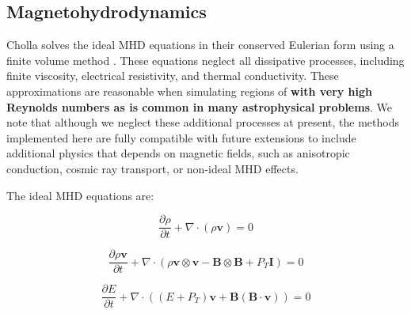 \documentclass[modern, linenumbers]{aastex631}
\begin{document}

\subsection{Magnetohydrodynamics}
\label{sec:methods-mhd}

Cholla solves the ideal MHD equations in their conserved Eulerian form using a finite volume method \citep{Godunov}. These equations neglect all dissipative processes, including finite viscosity, electrical resistivity, and thermal conductivity. These approximations are reasonable when simulating regions of \textbf{with very high Reynolds numbers as is common in many astrophysical problems}. We note that although we neglect these additional processes at present, the methods implemented here are fully compatible with future extensions to include additional physics that depends on magnetic fields, such as anisotropic conduction, cosmic ray transport, or non-ideal MHD effects.

The ideal MHD equations are:

\begin{equation}
    \label{eqn:mass-conservation}
    \frac{\partial \rho}{\partial t} + \nabla \cdot (\rho \boldsymbol{v}) = 0
\end{equation}

\begin{equation}
    \label{eqn:momentum-conservation}
    \frac{\partial \rho\boldsymbol{v}}{\partial t} + \nabla \cdot (\rho \boldsymbol{v}\otimes\boldsymbol{v} - \boldsymbol{B}\otimes\boldsymbol{B} + P_T\boldsymbol{I}) = 0
\end{equation}

\begin{equation}
    \label{eqn:energy-conservation}
    \frac{\partial E}{\partial t} + \nabla \cdot ( (E + P_T) \boldsymbol{v} + \boldsymbol{B}(\boldsymbol{B}\cdot\boldsymbol{v}) ) = 0
\end{equation}
\end{document}
